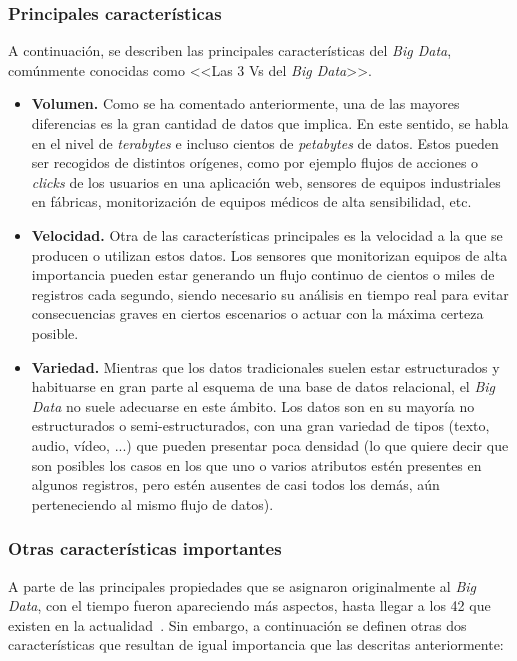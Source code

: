 \subsubsection{Principales características}

A continuación, se describen las principales características del \textit{Big Data}, comúnmente conocidas como <<Las 3 Vs del \textit{Big Data}>>. 

\begin{itemize}
    \item \textbf{Volumen.} Como se ha comentado anteriormente, una de las mayores diferencias es la gran cantidad de datos que implica. En este sentido, se habla en el nivel de \textit{terabytes} e incluso cientos de \textit{petabytes} de datos. Estos pueden ser recogidos de distintos orígenes, como por ejemplo flujos de acciones o \textit{clicks} de los usuarios en una aplicación web, sensores de equipos industriales en fábricas, monitorización de equipos médicos de alta sensibilidad, etc.  

    \item \textbf{Velocidad.} Otra de las características principales es la velocidad a la que se producen o utilizan estos datos. Los sensores que monitorizan equipos de alta importancia pueden estar generando un flujo continuo de cientos o miles de registros cada segundo, siendo necesario su análisis en tiempo real para evitar consecuencias graves en ciertos escenarios o actuar con la máxima certeza posible.
    
    \item \textbf{Variedad.} Mientras que los datos tradicionales suelen estar estructurados y habituarse en gran parte al esquema de una base de datos relacional, el \textit{Big Data} no suele adecuarse en este ámbito. Los datos son en su mayoría no estructurados o semi-estructurados, con una gran variedad de tipos (texto, audio, vídeo, ...) que pueden presentar poca densidad (lo que quiere decir que son posibles los casos en los que uno o varios atributos estén presentes en algunos registros, pero estén ausentes de casi todos los demás, aún perteneciendo al mismo flujo de datos).
\end{itemize}

\subsubsection{Otras características importantes}

A parte de las principales propiedades que se asignaron originalmente al \textit{Big Data}, con el tiempo fueron apareciendo más aspectos, hasta llegar a los 42 que existen en la actualidad~\cite{shaferData}. Sin embargo, a continuación se definen otras dos características que resultan de igual importancia que las descritas anteriormente:

